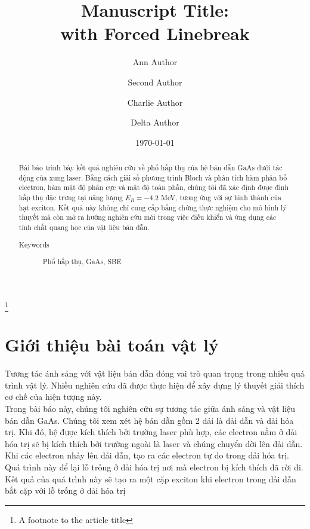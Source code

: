 \documentclass[%
 reprint,
 amsmath,amssymb,
 aps,
]{revtex4-2}
\begin{document}

\title{Manuscript Title:\\with Forced Linebreak}
\thanks{A footnote to the article title}

\author{Ann Author}
\author{Second Author}%
%


\author{Charlie Author}
\author{Delta Author}



\date{\today}

\begin{abstract}
	Bài báo trình bày kết quả nghiên cứu về phổ hấp thụ của hệ bán dẫn GaAs dưới tác động của xung laser. Bằng cách giải số phương trình Bloch và phân tích hàm phân bố electron, hàm mật độ phân cực và mật độ toàn phần, chúng tôi đã xác định được đỉnh hấp thụ đặc trưng tại năng lượng $E_{R}=-4.2$ MeV, tương ứng với sự hình thành của hạt exciton. Kết quả này không chỉ cung cấp bằng chứng thực nghiệm cho mô hình lý thuyết mà còn mở ra hướng nghiên cứu mới trong việc điều khiển và ứng dụng các tính chất quang học của vật liệu bán dẫn.
	\begin{description}
		\item[Keywords]
		Phổ hấp thụ, GaAs, SBE
	\end{description}
\end{abstract}
\maketitle
\section{\label{sec:level1}Giới thiệu bài toán vật lý}
Tương tác ánh sáng với vật liệu bán dẫn đóng vai trò quan trọng trong nhiều quá trình vật lý. Nhiều nghiên cứu đã được thực hiện để xây dựng lý thuyết giải thích cơ chế của hiện tượng này.\\
Trong bài báo này, chúng tôi nghiên cứu sự tương tác giữa ánh sáng và vật liệu bán dẫn GaAs. Chúng tôi xem xét hệ bán dẫn gồm 2 dải là dải dẫn và dải hóa trị. Khi đó, hệ được kích thích bởi trường laser phù hợp, các electron nằm ở dải hóa trị sẽ bị kích thích bởi trường ngoài là laser và chúng chuyển dời lên dải dẫn.\\
Khi các electron nhảy lên dải dẫn, tạo ra các electron tự do trong dải hóa trị. Quá trình này để lại lỗ trống ở dải hóa trị nơi mà electron bị kích thích đã rời đi. Kết quả của quá trình này sẽ tạo ra một cặp exciton khi electron trong dải dẫn bắt cặp với lỗ trống ở dải hóa trị
\end{document}

